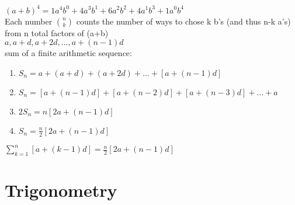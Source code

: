 \documentclass{article}
\begin{document}
$(a + b)^4 = 1a^4b^0 + 4a^3b^1 + 6a^2b^2 + 4a^1b^3 + 1a^0b^4$\\

Each number $\binom{n}{k}$ counts the number of ways to chose k b's (and thus n-k a's) from n total factors of (a+b)\\

$a, a + d, a + 2d, \ldots, a + (n - 1)d$\\

sum of a finite arithmetic sequence:
	\begin{enumerate}
		\item $S_n = a + (a + d) + (a + 2d) + \ldots + [a + (n - 1)d]$ 
		\item $S_n = [a + (n - 1)d] + [a + (n - 2)d] + [a + (n - 3)d] + \ldots + a$
		\item $2S_n = n[2a + (n - 1)d]$ 
		\item $S_n = \frac{n}{2}[2a + (n - 1)d]$
	\end{enumerate}

$\sum_{k = 1}^{n}[a + (k - 1)d] = \frac{n}{2}[2a + (n - 1)d]$

\section*{Trigonometry}

\begin{center}
\end{center}
\end{document}
